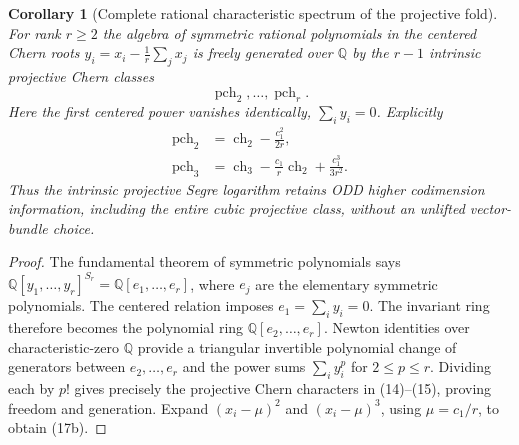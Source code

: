 \documentclass[11pt]{article}
\newtheorem{corollary}[theorem]{Corollary}
\begin{document}
\begin{corollary}[Complete rational characteristic spectrum of the projective fold]
For rank $r\ge2$ the algebra
of symmetric rational
polynomials in the centered
Chern roots
$y_i=x_i-\frac1r\sum_jx_j$
is freely generated over
$\mathbb Q$ by the
$r-1$ intrinsic projective
Chern classes
\[
 \boxed{
   \operatorname{pch}_2,\dots,
   \operatorname{pch}_r.
 }                                                       \tag{17a}
\]
Here the first centered power
vanishes identically,
$\sum_i y_i=0$.
Explicitly
\[
 \boxed{
 \begin{aligned}
  \operatorname{pch}_2
    &=\operatorname{ch}_2
      -\frac{c_1^2}{2r},\\
  \operatorname{pch}_3
    &=\operatorname{ch}_3
      -\frac{c_1}{r}\operatorname{ch}_2
      +\frac{c_1^3}{3r^2}.
 \end{aligned}
 }                                                       \tag{17b}
\]
Thus the intrinsic projective
Segre logarithm retains ODD
higher codimension information,
including the entire cubic
projective class, without
an unlifted vector-bundle
choice.
\end{corollary}
\begin{proof}
The fundamental theorem of
symmetric polynomials says
$\mathbb Q[y_1,\dots,y_r]^{S_r}
=\mathbb Q[e_1,\dots,e_r]$,
where $e_j$ are the elementary
symmetric polynomials. The
centered relation imposes
$e_1=\sum_i y_i=0$.
The invariant ring therefore
becomes the polynomial ring
$\mathbb Q[e_2,\dots,e_r]$.
Newton identities over
characteristic-zero $\mathbb Q$
provide a triangular invertible
polynomial change of
generators between
$e_2,\dots,e_r$ and
the power sums
$\sum_i y_i^p$ for
$2\le p\le r$.
Dividing each by $p!$
gives precisely the
projective Chern characters
in (14)--(15), proving
freedom and generation.
Expand $(x_i-\mu)^2$
and $(x_i-\mu)^3$,
using $\mu=c_1/r$,
to obtain (17b).
\end{proof}
\end{document}

